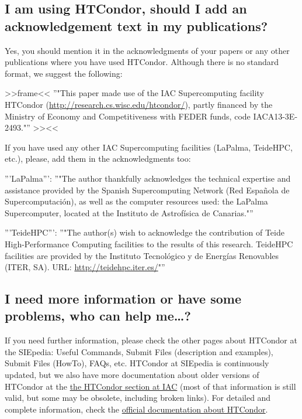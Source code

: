 \documentclass[a4paper,10pt]{article}
\begin{document}
\subsection{I am using HTCondor, should I add an acknowledgement text in my publications?}
\label{sec:orgee71596}

Yes, you should mention it in the acknowledgments of your papers or any other
publications where you have used HTCondor. Although there is no standard format,
we suggest the following:

>>frame<< ''"This paper made use of the IAC Supercomputing facility HTCondor
(\url{http://research.cs.wisc.edu/htcondor/}), partly financed by the Ministry of
Economy and Competitiveness with FEDER funds, code IACA13-3E-2493."''  >><<

If you have used any other IAC Supercomputing facilities (LaPalma, TeideHPC,
etc.), please, add them in the acknowledgments too:

'''LaPalma''': ''"The author thankfully acknowledges the technical expertise and
assistance provided by the Spanish Supercomputing Network (Red Española de
Supercomputación), as well as the computer resources used: the LaPalma
Supercomputer, located at the Instituto de Astrofísica de Canarias."''

'''TeideHPC''': ''"The author(s) wish to acknowledge the contribution of Teide
High-Performance Computing facilities to the results of this research. TeideHPC
facilities are provided by the Instituto Tecnológico y de Energías Renovables
(ITER, SA). URL: \url{http://teidehpc.iter.es/}"''

\subsection{I need more information or have some problems, who can help me\ldots{}?}
\label{sec:org91ca645}

If you need further information, please check the other pages about HTCondor at
the SIEpedia: Useful Commands, Submit Files (description and examples), Submit
Files (HowTo), FAQs, etc. HTCondor at SIEpedia is continuously updated, but we
also have more documentation about older versions of HTCondor at the \href{http://research.iac.es/sieinvens/SINFIN/Condor/index.php}{the
HTCondor section at IAC} (most of that information is still valid, but some may
be obsolete, including broken links). For detailed and complete information,
check the \href{http://research.cs.wisc.edu/htcondor/manual/v8.6/}{official documentation about HTCondor}.
\end{document}
